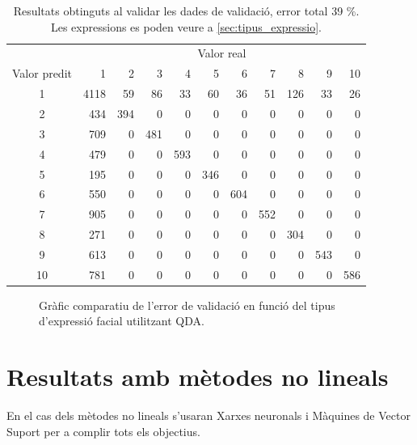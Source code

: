 \documentclass[a4paper]{article}
\begin{document}
\begin{table}[H]
	\centering
	\def\arraystretch{1.2}
	\begin{tabular}{|c|rrrrrrrrrr|}
		\hline
		& \multicolumn{10}{c|}{Valor real} \\
		Valor predit & 1 & 2 & 3 & 4 & 5 & 6 & 7 & 8 & 9 & 10 \\
		\hline
		1 & 4118 & 59 & 86 & 33 & 60 & 36 & 51 & 126 & 33 & 26 \\
		2 & 434 & 394 & 0 & 0 & 0 & 0 & 0 & 0 & 0 & 0 \\
		3 & 709 & 0 & 481 & 0 & 0 & 0 & 0 & 0 & 0 & 0 \\
		4 & 479 & 0 & 0 & 593 & 0 & 0 & 0 & 0 & 0 & 0 \\
		5 & 195 & 0 & 0 & 0 & 346 & 0 & 0 & 0 & 0 & 0 \\
		6 & 550 & 0 & 0 & 0 & 0 & 604 & 0 & 0 & 0 & 0 \\
		7 & 905 & 0 & 0 & 0 & 0 & 0 & 552 & 0 & 0 & 0 \\
		8 & 271 & 0 & 0 & 0 & 0 & 0 & 0 & 304 & 0 & 0 \\
		9 & 613 & 0 & 0 & 0 & 0 & 0 & 0 & 0 & 543 & 0 \\
		10 & 781 & 0 & 0 & 0 & 0 & 0 & 0 & 0 & 0 & 586 \\
		\hline
	\end{tabular}
	\captionsetup{width=0.8\textwidth}
	\caption{Resultats obtinguts al validar les dades de validació, error total 39 \%. Les expressions es poden veure a \autoref{sec:tipus_expressio}.}
	\label{tab:qda_k2}
\end{table}

\begin{figure}[H]
	\centering
	\captionsetup{width=0.8\textwidth}
	\caption{Gràfic comparatiu de l'error de validació en funció del tipus d'expressió facial utilitzant QDA.}
\end{figure}

\newpage
\section{Resultats amb mètodes no lineals}
En el cas dels mètodes no lineals s'usaran Xarxes neuronals i Màquines de Vector Suport per a complir tots els objectius.
\end{document}
